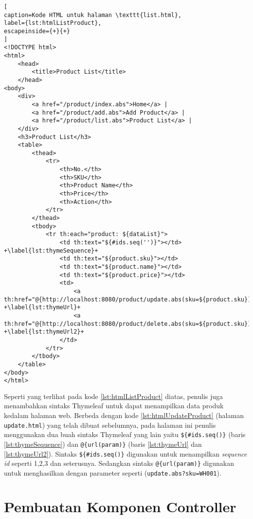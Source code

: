 \begin{lstlisting}[
caption=Kode HTML untuk halaman \texttt{list.html},
label={lst:htmlListProduct},
escapeinside={+}{+}
]
<!DOCTYPE html>
<html>
	<head>
		<title>Product List</title>
	</head>
<body>
	<div>
		<a href="/product/index.abs">Home</a> |
		<a href="/product/add.abs">Add Product</a> |
		<a href="/product/list.abs">Product List</a> |
	</div>
	<h3>Product List</h3>
	<table>
		<thead>
			<tr>
				<th>No.</th>
				<th>SKU</th>
				<th>Product Name</th>
				<th>Price</th>
				<th>Action</th>
			</tr>
		</thead>
		<tbody>
			<tr th:each="product: ${dataList}">
				<td th:text="${#ids.seq('')}"></td> +\label{lst:thymeSequence}+
				<td th:text="${product.sku}"></td>
				<td th:text="${product.name}"></td>
				<td th:text="${product.price}"></td>
				<td>
					<a th:href="@{http://localhost:8080/product/update.abs(sku=${product.sku})}">update</a>&nbsp;&nbsp; +\label{lst:thymeUrl}+
					<a th:href="@{http://localhost:8080/product/delete.abs(sku=${product.sku})}">delete</a> +\label{lst:thymeUrl2}+
				</td>
			</tr>
		</tbody>
	</table>
</body>
</html>
\end{lstlisting}

Seperti yang terlihat pada kode \ref{lst:htmlListProduct} diatas, penulis juga menambahkan sintaks Thymeleaf untuk dapat menampilkan data produk kedalam halaman web. Berbeda dengan kode \ref{lst:htmlUpdateProduct} (halaman \texttt{update.html}) yang telah dibuat sebelumnya, pada halaman ini penulis menggunakan dua buah sintaks Thymeleaf yang lain yaitu \texttt{\$\{\#ids.seq()\}} (baris \ref{lst:thymeSequence}) dan \texttt{@\{url(param)\}} (baris \ref{lst:thymeUrl} dan \ref{lst:thymeUrl2}). Sintaks \texttt{\$\{\#ids.seq()\}} digunakan untuk menampilkan \textit{sequence id} seperti 1,2,3 dan seterusnya. Sedangkan sintaks \texttt{@\{url(param)\}} digunakan untuk menghasilkan dengan parameter seperti (\texttt{update.abs?sku=WH001}).

\section{Pembuatan Komponen Controller}